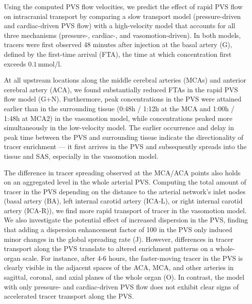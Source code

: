 \documentclass[fleqn,10pt]{wlscirep}
\begin{document}
Using the computed PVS flow velocities, we predict the effect of rapid PVS flow on intracranial transport by comparing a slow transport model (pressure-driven and cardiac-driven PVS flow) with a high-velocity model that accounts for all three mechanisms (pressure-, cardiac-, and vasomotion-driven). In both models, tracers were first observed 48 minutes after injection at the basal artery (G), defined by the first-time arrival (FTA), the time at which concentration first exceeds $0.1\,$mmol/l.

At all upstream locations along the middle cerebral arteries (MCAs) and anterior cerebral artery (ACA), we found substantially reduced FTAs in the rapid PVS flow model (G+N). Furthermore, peak concentrations in the PVS were attained earlier than in the surrounding tissue (0:48h / 1:12h at the MCA and 1:00h / 1:48h at MCA2) in the vasomotion model, while concentrations peaked more simultaneously in the low-velocity model. The earlier occurrence and delay in peak time between the PVS and surrounding tissue indicate the directionality of tracer enrichment — it first arrives in the PVS and subsequently spreads into the tissue and SAS, especially in the vasomotion model.

The difference in tracer spreading observed at the MCA/ACA points also holds on an aggregated level in the whole arterial PVS. Computing the total amount of tracer in the PVS depending on the distance to the arterial network's inlet nodes (basal artery (BA), left internal carotid artery (ICA-L), or right internal carotid artery (ICA-R)), we find more rapid transport of tracer in the vasomotion model. We also investigate the potential effect of increased dispersion in the PVS, finding that adding a dispersion enhancement factor of 100 in the PVS only induced minor changes in the global spreading rate (J). However, differences in tracer transport along the PVS translate to altered enrichment patterns on a whole-organ scale. For instance, after 4-6 hours, the faster-moving tracer in the PVS is clearly visible in the adjacent spaces of the ACA, MCA, and other arteries in sagittal, coronal, and axial planes of the whole organ (O). In contrast, the model with only pressure- and cardiac-driven PVS flow does not exhibit clear signs of accelerated tracer transport along the PVS.
\end{document}
